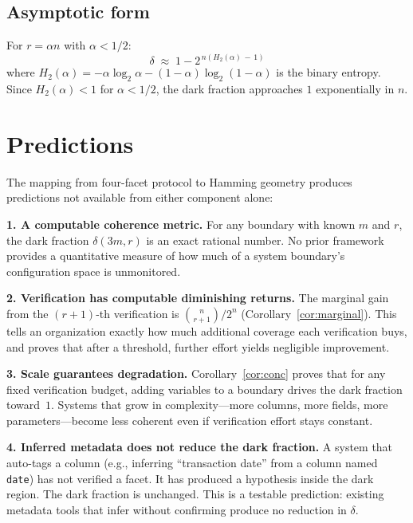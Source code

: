 \documentclass[11pt,a4paper]{article}
\begin{document}
\subsection{Asymptotic form}

For $r = \alpha n$ with $\alpha < 1/2$:
\[
\delta \;\approx\; 1 - 2^{\,n(H_2(\alpha)\,-\,1)}
\]
where $H_2(\alpha) = -\alpha\log_2\alpha - (1{-}\alpha)\log_2(1{-}\alpha)$ is the binary entropy. Since $H_2(\alpha) < 1$ for $\alpha < 1/2$, the dark fraction approaches $1$ exponentially in $n$.

\section{Predictions}
\label{sec:predictions}

The mapping from four-facet protocol to Hamming geometry produces predictions not available from either component alone:

\medskip\noindent\textbf{1. A computable coherence metric.} For any boundary with known $m$ and $r$, the dark fraction $\delta(3m, r)$ is an exact rational number. No prior framework provides a quantitative measure of how much of a system boundary's configuration space is unmonitored.

\medskip\noindent\textbf{2. Verification has computable diminishing returns.} The marginal gain from the $(r{+}1)$-th verification is $\binom{n}{r+1}/2^n$ (Corollary~\ref{cor:marginal}). This tells an organization exactly how much additional coverage each verification buys, and proves that after a threshold, further effort yields negligible improvement.

\medskip\noindent\textbf{3. Scale guarantees degradation.} Corollary~\ref{cor:conc} proves that for any fixed verification budget, adding variables to a boundary drives the dark fraction toward~$1$. Systems that grow in complexity---more columns, more fields, more parameters---become less coherent even if verification effort stays constant.

\medskip\noindent\textbf{4. Inferred metadata does not reduce the dark fraction.} A system that auto-tags a column (e.g., inferring ``transaction date'' from a column named \texttt{date}) has not verified a facet. It has produced a hypothesis inside the dark region. The dark fraction is unchanged. This is a testable prediction: existing metadata tools that infer without confirming produce no reduction in $\delta$.
\end{document}
